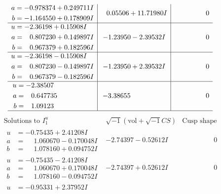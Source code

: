 \documentclass[1p]{elsarticle_modified}
\theoremstyle{definition}
\newcommand{\I}{\sqrt{-1}}
\begin{document}
$$\begin{array}{c|c|c}
\begin{aligned}
a &= -0.978374 + 0.249711 I \\
b &= -1.164550 + 0.178909 I\end{aligned}
 & \phantom{-}0.05506 + 11.71980 I & \phantom{-0.000000 } 0 \\ \hline\begin{aligned}
u &= -2.36198 + 0.15908 I \\
a &= \phantom{-}0.807230 + 0.149897 I \\
b &= \phantom{-}0.967379 + 0.182596 I\end{aligned}
 & -1.23950 - 2.39532 I & \phantom{-0.000000 } 0 \\ \hline\begin{aligned}
u &= -2.36198 - 0.15908 I \\
a &= \phantom{-}0.807230 - 0.149897 I \\
b &= \phantom{-}0.967379 - 0.182596 I\end{aligned}
 & -1.23950 + 2.39532 I & \phantom{-0.000000 } 0 \\ \hline\begin{aligned}
u &= -2.38507\phantom{ +0.000000I} \\
a &= \phantom{-}0.647735\phantom{ +0.000000I} \\
b &= \phantom{-}1.09123\phantom{ +0.000000I}\end{aligned}
 & -3.38655\phantom{ +0.000000I} & \phantom{-0.000000 } 0\\
 \hline 
 \end{array}$$\newpage$$\begin{array}{c|c|c}  
\text{Solutions to }I^u_{1}& \I (\text{vol} + \sqrt{-1}CS) & \text{Cusp shape}\\
 \hline 
\begin{aligned}
u &= -0.75435 + 2.41208 I \\
a &= \phantom{-}1.060670 - 0.170048 I \\
b &= \phantom{-}1.078160 + 0.094752 I\end{aligned}
 & -2.74397 - 0.52612 I & \phantom{-0.000000 } 0 \\ \hline\begin{aligned}
u &= -0.75435 - 2.41208 I \\
a &= \phantom{-}1.060670 + 0.170048 I \\
b &= \phantom{-}1.078160 - 0.094752 I\end{aligned}
 & -2.74397 + 0.52612 I & \phantom{-0.000000 } 0 \\ \hline\begin{aligned}
u &= -0.95331 + 2.37952 I \\

\end{aligned}
\end{array}$$
\end{document}
